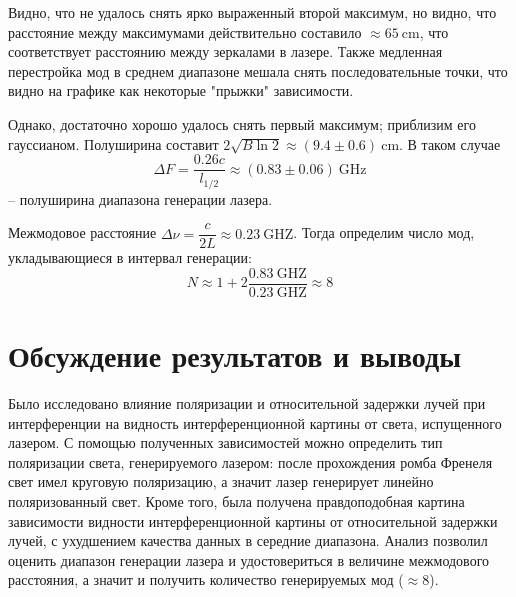 \documentclass[12pt, a4paper]{article}
\newcommand{\GHz}{~\mathrm{GHZ}}
\begin{document}
Видно, что не удалось снять ярко выраженный второй максимум, но видно, что
расстояние между максимумами действительно составило $\approx 65~\mathrm{cm}$,
что соответствует расстоянию между зеркалами в лазере. Также медленная
перестройка мод в среднем диапазоне мешала снять последовательные точки, что
видно на графике как некоторые "прыжки" зависимости.

Однако, достаточно хорошо удалось снять первый максимум; приблизим его
гауссианом. Полуширина составит $2\sqrt{B\ln{2}} \approx
    (9.4\pm0.6)~\mathrm{cm}$. В таком случае $$ \Delta F = \dfrac{0.26c}{l_{1/2}}
    \approx (0.83\pm0.06)~\mathrm{GHz}$$ -- полуширина диапазона генерации лазера.

Межмодовое расстояние $\Delta \nu = \dfrac{c}{2L} \approx 0.23\GHz$. Тогда
определим число мод, укладывающиеся в интервал генерации: $$N \approx 1 + 2
    \dfrac{0.83\GHz}{0.23\GHz} \approx 8$$
\section{Обсуждение результатов и выводы}
Было исследовано влияние поляризации и относительной задержки лучей при
интерференции на видность интерференционной картины от света, испущенного
лазером. С помощью полученных зависимостей можно определить тип поляризации
света, генерируемого лазером: после прохождения ромба Френеля свет имел
круговую поляризацию, а значит лазер генерирует линейно поляризованный свет.
Кроме того, была получена правдоподобная картина зависимости видности
интерференционной картины от относительной задержки лучей, с ухудшением
качества данных в середние диапазона. Анализ позволил оценить диапазон
генерации лазера и удостовериться в величине межмодового расстояния, а значит и
получить количество генерируемых мод ($\approx 8$).

\newpage
\end{document}

